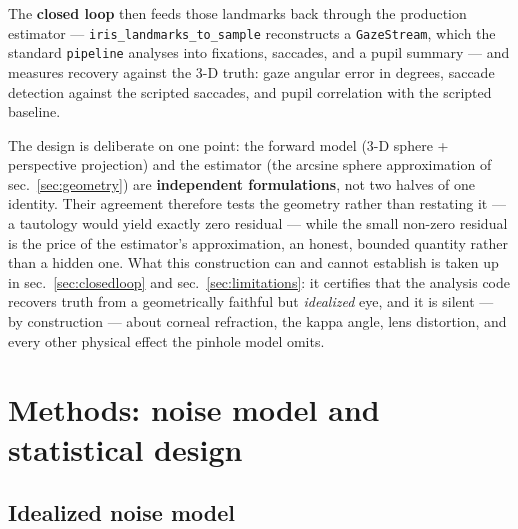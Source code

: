 \documentclass[
]{article}
\begin{document}
The \textbf{closed loop} then feeds those landmarks back through the
production estimator --- \texttt{iris\_landmarks\_to\_sample}
reconstructs a \texttt{GazeStream}, which the standard \texttt{pipeline}
analyses into fixations, saccades, and a pupil summary --- and measures
recovery against the 3-D truth: gaze angular error in degrees, saccade
detection against the scripted saccades, and pupil correlation with the
scripted baseline.

The design is deliberate on one point: the forward model (3-D sphere +
perspective projection) and the estimator (the arcsine sphere
approximation of sec.~\ref{sec:geometry}) are \textbf{independent
formulations}, not two halves of one identity. Their agreement therefore
tests the geometry rather than restating it --- a tautology would yield
exactly zero residual --- while the small non-zero residual is the price
of the estimator's approximation, an honest, bounded quantity rather
than a hidden one. What this construction can and cannot establish is
taken up in sec.~\ref{sec:closedloop} and sec.~\ref{sec:limitations}: it
certifies that the analysis code recovers truth from a geometrically
faithful but \emph{idealized} eye, and it is silent --- by construction
--- about corneal refraction, the kappa angle, lens distortion, and
every other physical effect the pinhole model omits.

\section{Methods: noise model and statistical
design}\label{sec:noisemodel}

\subsection{Idealized noise model}\label{idealized-noise-model}
\end{document}
